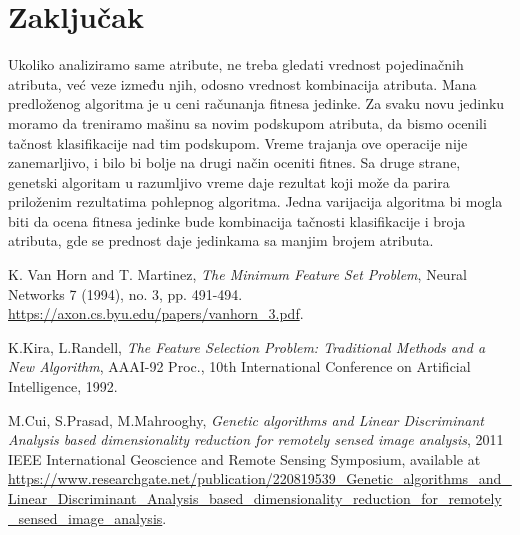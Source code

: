 \documentclass[11pt]{article} %
\begin{document}
\newpage
\section{Zaključak}
Ukoliko analiziramo same atribute, ne treba gledati vrednost pojedinačnih atributa, već veze između njih, odosno vrednost kombinacija atributa. \newline
Mana predloženog algoritma je u ceni računanja fitnesa jedinke. Za svaku novu jedinku moramo da treniramo mašinu sa novim podskupom atributa, da bismo ocenili tačnost klasifikacije nad tim podskupom. Vreme trajanja ove operacije nije zanemarljivo, i bilo bi bolje na drugi način oceniti fitnes. \newline
Sa druge strane, genetski algoritam u razumljivo vreme daje rezultat koji može da parira priloženim rezultatima pohlepnog algoritma. Jedna varijacija algoritma bi mogla biti da ocena fitnesa jedinke bude kombinacija tačnosti klasifikacije i broja atributa, gde se prednost daje jedinkama sa manjim brojem atributa.
\newpage

\newpage
\begin{thebibliography}{9}

 K. Van Horn and T. Martinez, \emph{The Minimum Feature Set Problem},  Neural Networks 7 (1994), no. 3, pp. 491-494.
\url{https://axon.cs.byu.edu/papers/vanhorn_3.pdf}.

 K.Kira, L.Randell, \emph{The Feature Selection Problem: Traditional Methods and a New Algorithm}, AAAI-92 Proc., 10th International Conference on Artificial Intelligence, 1992.

 M.Cui, S.Prasad, M.Mahrooghy, \emph{Genetic algorithms and Linear Discriminant Analysis based dimensionality reduction for remotely sensed image analysis},  2011 IEEE International Geoscience and Remote Sensing Symposium, available at 
\url{https://www.researchgate.net/publication/220819539_Genetic_algorithms_and_Linear_Discriminant_Analysis_based_dimensionality_reduction_for_remotely_sensed_image_analysis}.

\end{thebibliography}
\end{document}
